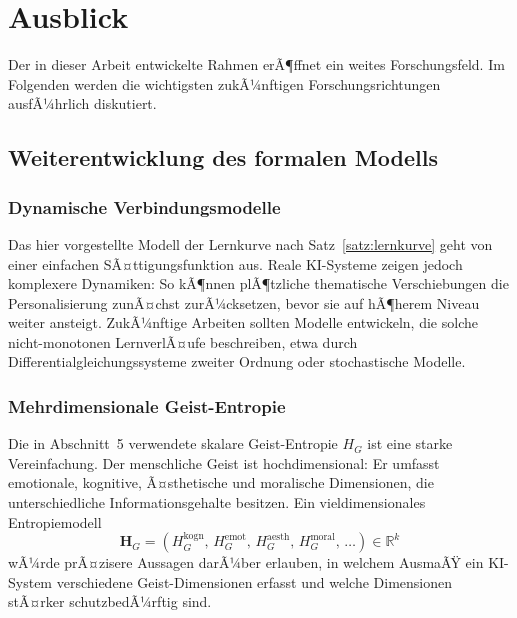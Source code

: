 ﻿\documentclass[a4paper,12pt]{article}
\theoremstyle{definition}
\begin{document}
\section{Ausblick}
\label{sec:ausblick}

Der in dieser Arbeit entwickelte Rahmen erÃ¶ffnet ein weites Forschungsfeld. Im Folgenden
werden die wichtigsten zukÃ¼nftigen Forschungsrichtungen ausfÃ¼hrlich diskutiert.

\subsection{Weiterentwicklung des formalen Modells}

\subsubsection{Dynamische Verbindungsmodelle}

Das hier vorgestellte Modell der Lernkurve nach Satz~\ref{satz:lernkurve} geht von einer
einfachen SÃ¤ttigungsfunktion aus. Reale KI-Systeme zeigen jedoch komplexere Dynamiken:
So kÃ¶nnen plÃ¶tzliche thematische Verschiebungen die Personalisierung zunÃ¤chst zurÃ¼cksetzen,
bevor sie auf hÃ¶herem Niveau weiter ansteigt. ZukÃ¼nftige Arbeiten sollten Modelle entwickeln,
die solche nicht-monotonen LernverlÃ¤ufe beschreiben, etwa durch Differentialgleichungssysteme
zweiter Ordnung oder stochastische Modelle.

\subsubsection{Mehrdimensionale Geist-Entropie}

Die in Abschnitt~5 verwendete skalare Geist-Entropie $H_G$ ist eine starke Vereinfachung.
Der menschliche Geist ist hochdimensional: Er umfasst emotionale, kognitive, Ã¤sthetische und
moralische Dimensionen, die unterschiedliche Informationsgehalte besitzen. Ein
vieldimensionales Entropiemodell
\[
    \mathbf{H}_G = (H_G^{\mathrm{kogn}},\, H_G^{\mathrm{emot}},\,
    H_G^{\mathrm{aesth}},\, H_G^{\mathrm{moral}},\, \ldots) \in \mathbb{R}^k
\]
wÃ¼rde prÃ¤zisere Aussagen darÃ¼ber erlauben, in welchem AusmaÃŸ ein KI-System
verschiedene Geist-Dimensionen erfasst und welche Dimensionen stÃ¤rker schutzbedÃ¼rftig sind.
\end{document}

